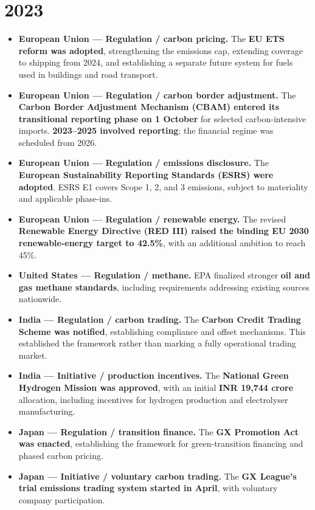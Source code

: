 \documentclass[11pt,a4paper]{article}
\newcommand{\entry}[3]{\item \textbf{#1 --- #2.} #3}
\begin{document}
\section*{2023}
\begin{itemize}
\entry{European Union}{Regulation / carbon pricing}{The \textbf{EU ETS reform was adopted}, strengthening the emissions cap, extending coverage to shipping from 2024, and establishing a separate future system for fuels used in buildings and road transport.\cite{fit55}}
\entry{European Union}{Regulation / carbon border adjustment}{The \textbf{Carbon Border Adjustment Mechanism (CBAM) entered its transitional reporting phase on 1 October} for selected carbon-intensive imports. \textbf{2023--2025 involved reporting}; the financial regime was scheduled from 2026.\cite{cbam}}
\entry{European Union}{Regulation / emissions disclosure}{The \textbf{European Sustainability Reporting Standards (ESRS) were adopted}. ESRS E1 covers Scope 1, 2, and 3 emissions, subject to materiality and applicable phase-ins.\cite{esrs}}
\entry{European Union}{Regulation / renewable energy}{The revised \textbf{Renewable Energy Directive (RED III) raised the binding EU 2030 renewable-energy target to 42.5\%}, with an additional ambition to reach 45\%.\cite{red3}}
\entry{United States}{Regulation / methane}{EPA finalized stronger \textbf{oil and gas methane standards}, including requirements addressing existing sources nationwide.\cite{methane2023}}
\entry{India}{Regulation / carbon trading}{The \textbf{Carbon Credit Trading Scheme was notified}, establishing compliance and offset mechanisms. This established the framework rather than marking a fully operational trading market.\cite{indiaccts}}
\entry{India}{Initiative / production incentives}{The \textbf{National Green Hydrogen Mission was approved}, with an initial \textbf{INR 19,744 crore} allocation, including incentives for hydrogen production and electrolyser manufacturing.\cite{indiah2}}
\entry{Japan}{Regulation / transition finance}{The \textbf{GX Promotion Act was enacted}, establishing the framework for green-transition financing and phased carbon pricing.\cite{gxact}}
\entry{Japan}{Initiative / voluntary carbon trading}{The \textbf{GX League's trial emissions trading system started in April}, with voluntary company participation.\cite{gxleague}}
\end{itemize}
\end{document}
